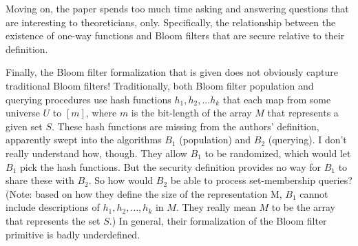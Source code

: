 Moving on, the paper spends too much time asking and answering questions that are interesting to theoreticians, only.  Specifically, the relationship between the existence of one-way functions and Bloom filters that are secure relative to their definition.


Finally, the Bloom filter formalization that is given does not obviously capture traditional Bloom filters!  Traditionally, both Bloom filter population and querying procedures use hash functions $h_1,h_2,...h_k$ that each map from some universe $U$ to $[m]$, where $m$ is the bit-length of the array $M$ that represents a given set $S$.  These hash functions are missing from the authors’ definition, apparently swept into the algorithms $B_1$ (population) and $B_2$ (querying).  I don't really understand how, though. They allow $B_1$ to be randomized, which would let $B_1$ pick the hash functions.  But the security definition provides no way for $B_1$ to share these with $B_2$.  So how would $B_2$ be able to process set-membership queries?  (Note: based on how they define the size of the representation M, $B_1$ cannot include descriptions of $h_1, h_2, \ldots , h_k$ in $M$.  They really mean $M$ to be the array that represents the set $S$.)  In general, their formalization of the Bloom filter primitive is badly underdefined.


